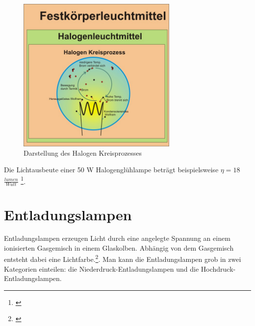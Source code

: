 \begin{figure}[H]     %
\centering
\includegraphics[width=0.7\textwidth]{bilder/halogenkreis} 
\caption {Darstellung des Halogen Kreisprozesses\protect\footnotemark}\label{b_halogenkreis}
\end{figure}

\noindent Die Lichtausbeute einer 50 W Halogenglühlampe beträgt beispielsweise $\eta=18$ $\frac{lumen}{Watt}$ \footnote{\cite[35]{greule}}.

\section{Entladungslampen} \label{sec_entladungslampe}
Entladungslampen erzeugen Licht durch eine angelegte Spannung an einem ionisierten Gasgemisch in einem Glaskolben. Abhängig von dem Gasgemisch entsteht dabei eine Lichtfarbe.\footnote{\cite[140]{mueller}}. Man kann die Entladungslampen grob in zwei Kategorien einteilen: die Niederdruck-Entladungslampen und die Hochdruck-Entladungslampen.\\


